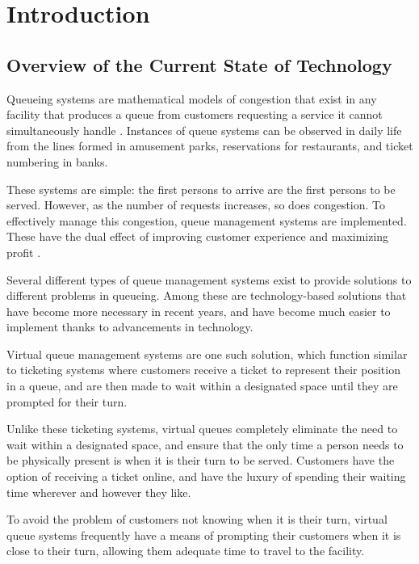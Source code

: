 \chapter{Introduction}
\label{sec:researchdesc} %

\section{Overview of the Current State of Technology}
\label{sec:overview}

Queueing systems are mathematical models of congestion that exist in any facility that produces a queue from customers requesting a service it cannot simultaneously handle \cite{Armero2001,Srivasta2003}. Instances of queue systems can be observed in daily life from the lines formed in amusement parks, reservations for restaurants, and ticket numbering in banks.

These systems are simple: the first persons to arrive are the first persons to be served. However, as the number of requests increases, so does congestion. To effectively manage this congestion, queue management systems are implemented. These have the dual effect of improving customer experience and maximizing profit \cite{TamisCorp2013}.

Several different types of queue management systems exist to provide solutions to different problems in queueing. Among these are technology-based solutions that have become more necessary in recent years, and have become much easier to implement thanks to advancements in technology.

Virtual queue management systems are one such solution, which function similar to ticketing systems where customers receive a ticket to represent their position in a queue, and are then made to wait within a designated space until they are prompted for their turn.

Unlike these ticketing systems, virtual queues completely eliminate the need to wait within a designated space, and ensure that the only time a person needs to be physically present is when it is their turn to be served. Customers have the option of receiving a ticket online, and have the luxury of spending their waiting time wherever and however they like.

To avoid the problem of customers not knowing when it is their turn, virtual queue systems frequently have a means of prompting their customers when it is close to their turn, allowing them adequate time to travel to the facility.

